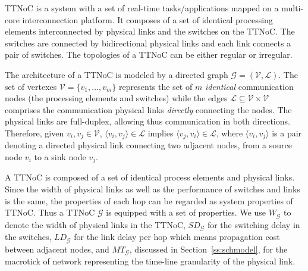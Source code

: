 \documentclass[journal]{IEEEtran}
\newcommand{\calG}{\mathcal{G}}
\newcommand{\calV}{\mathcal{V}}
\newcommand{\calL}{\mathcal{L}}
\newcommand{\width}{\mathit{W}_\calG}
\newcommand{\SD}{\mathit{SD}_\calG}
\newcommand{\HD}{\mathit{LD}_\calG}
\newcommand{\MT}{\mathit{MT}_\calG}
\begin{document}
TTNoC is a system with a set of real-time tasks/applications mapped on
a multi-core interconnection platform.  It composes of a set of
identical processing elements interconnected by physical links and the
switches on the TTNoC.  The switches are connected by bidirectional
physical links and each link connects a pair of switches.  The
topologies of a TTNoC can be either regular or irregular.

The architecture of a TTNoC is
modeled by a directed graph $\calG=(\calV,\calL)$. The set of vertexes
$\mathcal{V}=\{ v_{1},\dots,v_{m}\}$ represents the set of $m$
\emph{identical} communication nodes (the processing elements and
switches) while the edges $\mathcal{L}\subseteq \mathcal{V} \times
\mathcal{V}$ comprises the communication physical links
\emph{directly} connecting the nodes.  The physical links are
full-duplex, allowing thus communication in both
directions. Therefore, given $v_i,v_j\in\calV$, $\langle
v_i,v_j\rangle \in\calL$ implies $\langle v_j,v_i\rangle\in\calL$,
where $\langle v_i,v_j\rangle$ is a pair denoting a directed physical
link connecting two adjacent nodes, from a source node $v_i$ to a sink node $v_j$.

 
A TTNoC is composed of a set of identical process elements and
physical links.  Since the width of physical links as well as the
performance of switches and links is the same, the properties of each
hop can be regarded as system properties of TTNoC.  Thus a TTNoC
$\calG$ is equipped with a set of properties.  We use $\width$ to
denote the width of physical links in the TTNoC, $\SD$ for the
switching delay in the switches, $\HD$ for the link delay per hop
which means propagation cost between adjacent nodes, and $\MT$,
discussed in Section~\ref{ss:schmodel}, for the macrotick of network
representing the time-line granularity of the physical link.

\end{document}
